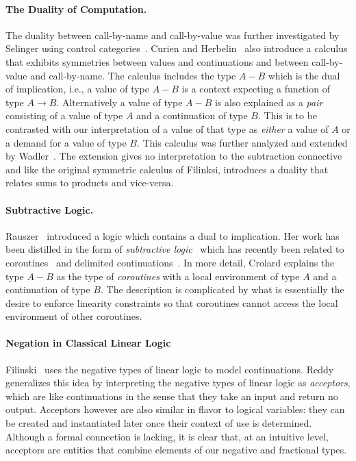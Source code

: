 \documentclass[preprint]{sigplanconf}
\begin{document}
\paragraph*{The Duality of Computation.}
The duality between call-by-name and call-by-value was further investigated
by Selinger using control
categories~\cite{Selinger:2001:CCD:966910.966911}. Curien and
Herbelin~\cite{Curien:2000} also introduce a calculus that exhibits
symmetries between values and continuations and between call-by-value and
call-by-name. The calculus includes the type $A-B$ which is the dual of
implication, i.e., a value of type $A-B$ is a context expecting a function of
type $A \rightarrow B$. Alternatively a value of type $A-B$ is also explained
as a \emph{pair} consisting of a value of type $A$ and a continuation of type
$B$. This is to be contrasted with our interpretation of a value of that type
as \emph{either} a value of $A$ or a demand for a value of type $B$. This
calculus was further analyzed and extended by
Wadler~\cite{Wadler:2003,DBLP:conf/rta/Wadler05}. The extension gives no
interpretation to the subtraction connective and like the original symmetric
calculus of Filinksi, introduces a duality that relates sums to products and
vice-versa.

\paragraph*{Subtractive Logic.} 
Rauszer~\cite{springerlink:10.1007/BF02120864,rauszer,rauszer2} introduced a
logic which contains a dual to implication. Her work has been distilled in
the form of \emph{subtractive logic}~\cite{Crolard01} which has recently been
related to coroutines~\cite{Crolard01082004} and delimited
continuations~\cite{Ariola:2009:TFD:1743339.1743381}.  In more detail,
Crolard explains the type $A-B$ as the type of \emph{coroutines} with a local
environment of type $A$ and a continuation of type $B$. The description is
complicated by what is essentially the desire to enforce linearity
constraints so that coroutines cannot access the local environment of other
coroutines. 

\paragraph*{Negation in Classical Linear Logic} 
Filinski~\cite{Filinski92} uses the negative types of linear logic to model
continuations. Reddy~\cite{Reddy91} generalizes this idea by interpreting the
negative types of linear logic as \emph{acceptors}, which are like
continuations in the sense that they take an input and return no
output. Acceptors however are also similar in flavor to logical variables:
they can be created and instantiated later once their context of use is
determined. Although a formal connection is lacking, it is clear that, at an
intuitive level, acceptors are entities that combine elements of our negative
and fractional types.
\end{document}
